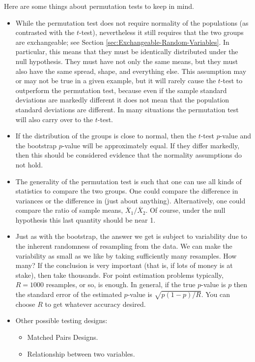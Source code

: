 \documentclass[captions=tableheading]{scrbook}
\begin{document}
\begin{rem}
Here are some things about permutation tests to keep in mind.
\begin{itemize}
\item While the permutation test does not require normality of the populations (as contrasted with the \(t\)-test), nevertheless it still requires that the two groups are exchangeable; see Section \ref{sec:Exchangeable-Random-Variables}. In particular, this means that they must be identically distributed under the null hypothesis. They must have not only the same means, but they must also have the same spread, shape, and everything else. This assumption may or may not be true in a given example, but it will rarely cause the \(t\)-test to outperform the permutation test, because even if the sample standard deviations are markedly different it does not mean that the population standard deviations are different. In many situations the permutation test will also carry over to the \(t\)-test.
\item If the distribution of the groups is close to normal, then the \(t\)-test \(p\)-value and the bootstrap \(p\)-value will be approximately equal. If they differ markedly, then this should be considered evidence that the normality assumptions do not hold.
\item The generality of the permutation test is such that one can use all kinds of statistics to compare the two groups. One could compare the difference in variances or the difference in (just about anything). Alternatively, one could compare the ratio of sample means, \(\overline{X}_{1}/\overline{X}_{2}\). Of course, under the null hypothesis this last quantity should be near 1.
\item Just as with the bootstrap, the answer we get is subject to variability due to the inherent randomness of resampling from the data. We can make the variability as small as we like by taking sufficiently many resamples. How many? If the conclusion is very important (that is, if lots of money is at stake), then take thousands. For point estimation problems typically, \(R=1000\) resamples, or so, is enough. In general, if the true \(p\)-value is \(p\) then the standard error of the estimated \(p\)-value is \(\sqrt{p(1-p)/R}\). You can choose \(R\) to get whatever accuracy desired.
\end{itemize}

\end{rem}

\begin{itemize}
\item Other possible testing designs:
\begin{itemize}
\item Matched Pairs Designs.
\item Relationship between two variables.
\end{itemize}
\end{itemize}
\end{document}
